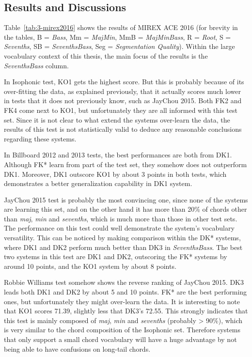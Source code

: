 \subsection{Results and Discussions}
Table~\ref{tab:3-mirex2016} shows the results of MIREX ACE 2016 (for brevity in the tables, B = \textit{Bass}, Mm = \textit{MajMin}, MmB = \textit{MajMinBass}, R = \textit{Root}, S = \textit{Sevenths}, SB = \textit{SeventhsBass}, Seg = \textit{Segmentation Quality}). Within the large vocabulary context of this thesis, the main focus of the results is the \textit{SeventhsBass} column.

In Isophonic test, KO1 gets the highest score. But this is probably because of its over-fitting the data, as explained previously, that it actually scores much lower in tests that it does not previously know, such as JayChou 2015. Both FK2 and FK4 come next to KO1, but unfortunately they are all informed with this test set. Since it is not clear to what extend the systems over-learn the data, the results of this test is not statistically valid to deduce any reasonable conclusions regarding these systems.

In Billboard 2012 and 2013 tests, the best performances are both from DK1. Although FK* learn from part of the test set, they somehow does not outperform DK1. Moreover, DK1 outscore KO1 by about 3 points in both tests, which demonstrates a better generalization capability in DK1 system.

JayChou 2015 test is probably the most convincing one, since none of the systems are learning this set, and on the other hand it has more than 20\% of chords other than \textit{maj}, \textit{min} and \textit{sevenths}, which is much more than those in other test sets. The performance on this test could well demonstrate the system's vocabulary versatility. This can be noticed by making comparison within the DK* systems, where DK1 and DK2 perform much better than DK3 in \textit{SeventhsBass}. The best two systems in this test are DK1 and DK2, outscoring the FK* systems by around 10 points, and the KO1 system by about 8 points.

Robbie Williams test somehow shows the reverse ranking of JayChou 2015. DK3 leads both DK1 and DK2 by about 5 and 10 points. FK* are the best performing ones, but unfortunately they might over-learn the data. It is interesting to note that KO1 scores 71.39, slightly less that DK3's 72.55. This strongly indicates that this test is mainly composed of \textit{maj}, \textit{min} and \textit{sevenths} (probably > 90\%), which is very similar to the chord composition of the Isophonic set. Therefore systems that only support a small chord vocabulary will have a huge advantage by not being able to have confusions on long-tail chords.

